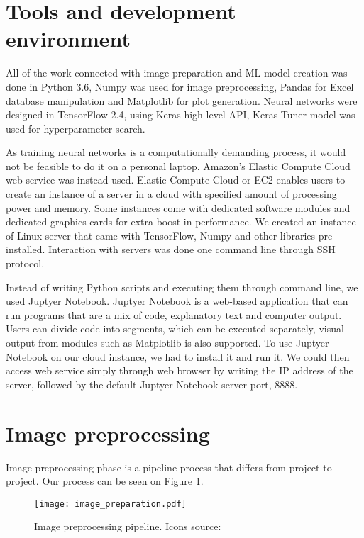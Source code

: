 \section{ Tools and development environment}

All of the work connected with image preparation and ML model creation was done in Python 3.6, Numpy was used for image preprocessing, Pandas for Excel database manipulation and Matplotlib for plot generation.
Neural networks were designed in TensorFlow 2.4, using Keras high level API, Keras Tuner model was used for hyperparameter search.

As training neural networks is a computationally demanding process, it would not be feasible to do it on a personal laptop.
Amazon's Elastic Compute Cloud web service was instead used.
Elastic Compute Cloud or EC2 enables users to create an instance of a server in a cloud with specified amount of processing power and memory.
Some instances come with dedicated software modules and dedicated graphics cards for extra boost in performance.
We created an instance of Linux server that came with TensorFlow, Numpy and other libraries pre-installed.
Interaction with servers was done one command line through SSH protocol.

Instead of writing Python scripts and executing them through command line, we used Juptyer Notebook. 
Juptyer Notebook is a web-based application that can run programs that are a mix of code, explanatory text and computer output.
Users can divide code into segments, which can be executed separately, visual output from modules such as Matplotlib is also supported.
To use Juptyer Notebook on our cloud instance, we had to install it and run it.
We could then access web service simply through web browser by writing the IP address of the server, followed by the default Juptyer Notebook server port, 8888.


\section{ Image preprocessing}

Image preprocessing phase is a pipeline process that differs from project to project.
Our process can be seen on Figure \ref{image_preparation}.

\begin{figure}[ht]
    \centering
    \texttt{[image: image\_preparation.pdf]} 
    \caption{Image preprocessing pipeline. Icons source:\cite{icons}}
    \label{image_preparation}
\end{figure}

